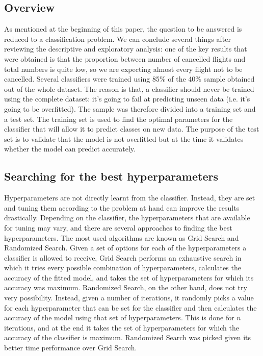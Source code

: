 \documentclass{article}
\begin{document}
	\subsection{Overview}
		As mentioned at the beginning of this paper, the question to be answered is reduced to a classification problem. We can conclude several things after reviewing the descriptive and exploratory analysis: one of the key results that were obtained is that the proportion between number of cancelled flights and total numbers is quite low, so we are expecting almost every flight not to be cancelled.\newline
		\indent Several classifiers were trained using 85\% of the 40\% sample obtained out of the whole dataset. The reason is that, a classifier should never be trained using the complete dataset: it's going to fail at predicting unseen data (i.e. it's going to be overfitted). The sample was therefore divided into a training set and a test set. The training set is used to find the optimal parameters for the classifier that will allow it to predict classes on new data. The purpose of the test set is to validate that the model is not overfitted but at the time it validates whether the model can predict accurately.\newline
	\subsection{Searching for the best hyperparameters}
		Hyperparameters are not directly learnt from the classifier. Instead, they are set and tuning them according to the problem at hand can improve the results drastically. Depending on the classifier, the hyperparameters that are available for tuning may vary, and there are several approaches to finding the best hyperparameters. The most used algorithms are known as Grid Search and Randomized Search.\newline
		\indent Given a set of options for each of the hyperparameters a classifier is allowed to receive, Grid Search performs an exhaustive search in which it tries every possible combination of hyperparameters, calculates the accuracy of the fitted model, and takes the set of hyperparameters for which its accuracy was maximum. Randomized Search, on the other hand, does not try very possibility. Instead, given a number of iterations, it randomly picks a value for each hyperparameter that can be set for the classifier and then calculates the accuracy of the model using that set of hyperparameters. This is done for $n$ iterations, and at the end it takes the set of hyperparameters for which the accuracy of the classifier is maximum. Randomized Search was picked given its better time performance over Grid Search.
\end{document}
